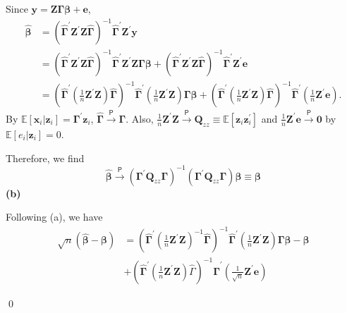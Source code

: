 \documentclass[12pt, a4paper,oneside,leqno]{article}
\renewenvironment{proof}{\noindent{ Proof.}\hspace*{1em}}{\qed\vspace{1em}\\}
\begin{document}
\begin{spacing}{1.3}
{\begin{shaded}
\begin{proof}
     Since $\bm{y} = \bm{Z} \bm{\Gamma} \bm{\beta} + \bm{e}     $,
     \begin{align*}
       \widehat{\bm{\beta} } &= \left( \widehat{\bm{\Gamma} }^\prime \bm{Z}^\prime \bm{Z} \widehat{\bm{\Gamma} }     \right)^{-1} \widehat{\bm{\Gamma} }^\prime \bm{Z}^\prime \bm{y}   \\
       &=  \left( \widehat{\bm{\Gamma} }^\prime \bm{Z}^\prime \bm{Z} \widehat{\bm{\Gamma} }     \right)^{-1} \widehat{\bm{\Gamma} }^\prime \bm{Z}^\prime \bm{Z} \bm{\Gamma} \bm{\beta} +  \left( \widehat{\bm{\Gamma} }^\prime \bm{Z}^\prime \bm{Z} \widehat{\bm{\Gamma} }     \right)^{-1} \widehat{\bm{\Gamma} }^\prime \bm{Z}^\prime \bm{e}    \\
       &=  \left( \widehat{\bm{\Gamma} }^\prime \left(\frac{1}{n}\bm{Z}^\prime \bm{Z}\right) \widehat{\bm{\Gamma} }     \right)^{-1} \widehat{\bm{\Gamma} }^\prime \left(\frac{1}{n}\bm{Z}^\prime \bm{Z}\right) \bm{\Gamma} \bm{\beta} +  \left( \widehat{\bm{\Gamma} }^\prime \left(\frac{1}{n}\bm{Z}^\prime \bm{Z}\right) \widehat{\bm{\Gamma} }     \right)^{-1} \widehat{\bm{\Gamma} }^\prime (\frac{1}{n}\bm{Z}^\prime \bm{e}).   
     \end{align*}
       By $\mathbb{E}[\bm{x}_{i} | \bm{z}_{i}  ] = \bm{\Gamma}^\prime \bm{z}_{i}  $, $\widehat{\bm{\Gamma} } \stackrel{\mathsf{P}}{\longrightarrow} \bm{\Gamma}  $. Also, $\frac{1}{n}\bm{Z}^\prime \bm{Z} \stackrel{\mathsf{P}}{\longrightarrow} \bm{Q}_{zz}\equiv \mathbb{E}[\bm{z}_{i}\bm{z}_{i}^\prime  ]   $ and $ \frac{1}{n}\bm{Z}^\prime \bm{e} \stackrel{\mathsf{P}}{\longrightarrow} \bm{0}   $ by $\mathbb{E}[e_{i}|\bm{z}_{i} ]=0$.

       Therefore, we find \[
         \widehat{\bm{\beta} } \stackrel{\mathsf{P}}{\longrightarrow} \left( \bm{\Gamma}^\prime \bm{Q}_{zz} \bm{\Gamma}    \right)^{-1} \left( \bm{\Gamma}^\prime \bm{Q}_{zz} \bm{\Gamma}    \right) \bm{\beta} \equiv \bm{\beta}   
       \]
   \textbf{(b)}

       Following (a), we have 
\begin{align}
  \sqrt{n}\left( \widehat{\bm{\beta} } - \bm{\beta}   \right) &=  \left( \widehat{\bm{\Gamma} }^\prime \left( \frac{1}{n}\bm{Z}^\prime \bm{Z}   \right)^{-1} \widehat{\bm{\Gamma} }   \right)^{-1} \widehat{\bm{\Gamma} }^\prime \left( \frac{1}{n} \bm{Z}^\prime \bm{Z}   \right)\bm{\Gamma}\bm{\beta} - \bm{\beta} \label{term1} \\
  &+ \left( \widehat{\bm{\Gamma} }^\prime \left( \frac{1}{n}\bm{Z}^\prime\bm{Z}   \right)\widehat{\Gamma}   \right)^{-1} \widehat{\bm{\Gamma} }^\prime \left( \frac{1}{\sqrt{n} } \bm{Z}^\prime \bm{e}  \right) 
\end{align}         


\end{proof}
\end{shaded}}
\end{spacing}
\end{document}
